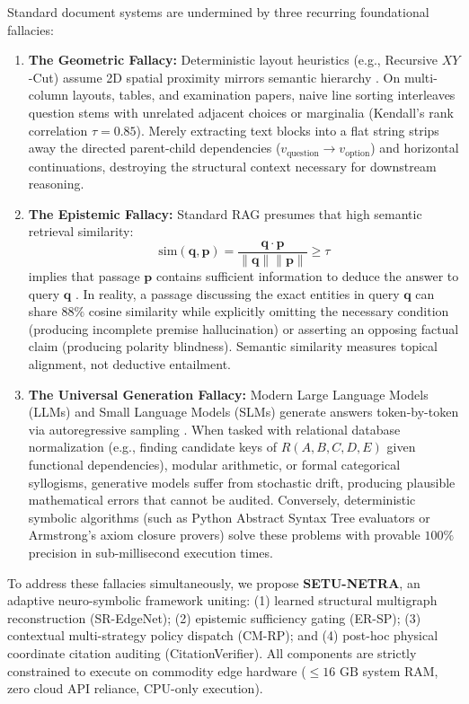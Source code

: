 \documentclass[conference]{IEEEtran}
\begin{document}
Standard document systems are undermined by three recurring foundational fallacies:
\begin{enumerate}
    \item \textbf{The Geometric Fallacy:} Deterministic layout heuristics (e.g., Recursive $XY$-Cut) assume 2D spatial proximity mirrors semantic hierarchy \cite{ha1995xycut}. On multi-column layouts, tables, and examination papers, naive line sorting interleaves question stems with unrelated adjacent choices or marginalia (Kendall's rank correlation $\tau = 0.85$). Merely extracting text blocks into a flat string strips away the directed parent-child dependencies ($v_{\text{question}} \rightarrow v_{\text{option}}$) and horizontal continuations, destroying the structural context necessary for downstream reasoning.
    \item \textbf{The Epistemic Fallacy:} Standard RAG presumes that high semantic retrieval similarity:
    \begin{equation}
    \text{sim}(\mathbf{q}, \mathbf{p}) = \frac{\mathbf{q} \cdot \mathbf{p}}{\|\mathbf{q}\| \|\mathbf{p}\|} \ge \tau
    \end{equation}
    implies that passage $\mathbf{p}$ contains sufficient information to deduce the answer to query $\mathbf{q}$ \cite{karpukhin2020dpr}. In reality, a passage discussing the exact entities in query $\mathbf{q}$ can share $88\%$ cosine similarity while explicitly omitting the necessary condition (producing incomplete premise hallucination) or asserting an opposing factual claim (producing polarity blindness). Semantic similarity measures topical alignment, not deductive entailment.
    \item \textbf{The Universal Generation Fallacy:} Modern Large Language Models (LLMs) and Small Language Models (SLMs) generate answers token-by-token via autoregressive sampling \cite{brown2020gpt3}. When tasked with relational database normalization (e.g., finding candidate keys of $R(A, B, C, D, E)$ given functional dependencies), modular arithmetic, or formal categorical syllogisms, generative models suffer from stochastic drift, producing plausible mathematical errors that cannot be audited. Conversely, deterministic symbolic algorithms (such as Python Abstract Syntax Tree evaluators or Armstrong's axiom closure provers) solve these problems with provable $100\%$ precision in sub-millisecond execution times.
\end{enumerate}

To address these fallacies simultaneously, we propose \textbf{SETU-NETRA}, an adaptive neuro-symbolic framework uniting: (1) learned structural multigraph reconstruction (SR-EdgeNet); (2) epistemic sufficiency gating (ER-SP); (3) contextual multi-strategy policy dispatch (CM-RP); and (4) post-hoc physical coordinate citation auditing (CitationVerifier). All components are strictly constrained to execute on commodity edge hardware ($\le 16\text{ GB}$ system RAM, zero cloud API reliance, CPU-only execution).
\end{document}
